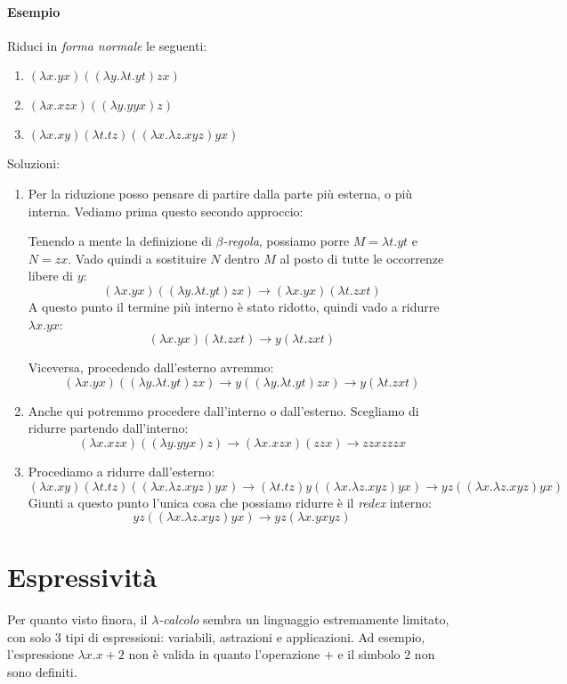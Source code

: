 \documentclass[12pt, a4paper]{report}
\theoremstyle{definition}
\begin{document}
\paragraph*{Esempio}
Riduci in \emph{forma normale} le seguenti:
\begin{enumerate}
    \item \((\lambda x.yx)((\lambda y.\lambda t.yt)zx)\)
    \item \((\lambda x.xzx)((\lambda y.yyx)z)\)
    \item \((\lambda x.xy)(\lambda t.tz)((\lambda x.\lambda z.xyz)yx)\)
\end{enumerate}
Soluzioni:
\begin{enumerate}
    \item Per la riduzione posso pensare di partire dalla parte più esterna, o
    più interna. Vediamo prima questo secondo approccio:

    Tenendo a mente la definizione di \emph{$\beta$-regola}, possiamo porre
    $M=\lambda t.yt$ e $N=zx$. Vado quindi a sostituire $N$ dentro $M$ al posto
    di tutte le occorrenze libere di $y$:
    \[(\lambda x.yx)((\lambda y.\lambda t.yt)zx)\to(\lambda x.yx)(\lambda t.zxt)\]
    A questo punto il termine più interno è stato ridotto, quindi vado a
    ridurre \(\lambda x.yx\):
    \[(\lambda x.yx)(\lambda t.zxt)\to y(\lambda t.zxt)\]

    Viceversa, procedendo dall'esterno avremmo:
    \[(\lambda x.yx)((\lambda y.\lambda t.yt)zx)\to y((\lambda y.\lambda t.yt)zx)
    \to y(\lambda t.zxt)\]
    \item Anche qui potremmo procedere dall'interno o dall'esterno. Scegliamo di
    ridurre partendo dall'interno:
    \[(\lambda x.xzx)((\lambda y.yyx)z)\to(\lambda x.xzx)(zzx)\to zzxzzzx\]
    \item Procediamo a ridurre dall'esterno:
    \[(\lambda x.xy)(\lambda t.tz)((\lambda x.\lambda z.xyz)yx)\to(\lambda t.tz)
    y((\lambda x.\lambda z.xyz)yx)\to yz((\lambda x.\lambda z.xyz)yx)\]
    Giunti a questo punto l'unica cosa che possiamo ridurre è il \emph{redex}
    interno:
    \[yz((\lambda x.\lambda z.xyz)yx)\to yz(\lambda x.yxyz)\]
\end{enumerate}

\section{Espressività}
Per quanto visto finora, il \emph{$\lambda$-calcolo} sembra un linguaggio estremamente
limitato, con solo 3 tipi di espressioni: variabili, astrazioni e applicazioni.
Ad esempio, l'espressione \(\lambda x.x+2\) non è valida in quanto l'operazione
$+$ e il simbolo $2$ non sono definiti.
\end{document}
